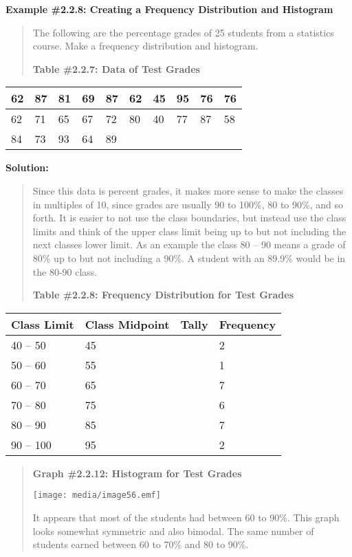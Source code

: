 \documentclass[]{book}
\begin{document}
\textbf{Example \#2.2.8: Creating a Frequency Distribution and Histogram}

\begin{quote}
The following are the percentage grades of 25 students from a
statistics course. Make a frequency distribution and histogram.

\textbf{Table \#2.2.7: Data of Test Grades}
\end{quote}

\begin{longtable}[]{@{}llllllllll@{}}
\toprule
62 & 87 & 81 & 69 & 87 & 62 & 45 & 95 & 76 & 76\tabularnewline
\midrule
\endhead
62 & 71 & 65 & 67 & 72 & 80 & 40 & 77 & 87 & 58\tabularnewline
84 & 73 & 93 & 64 & 89 & & & & &\tabularnewline
\bottomrule
\end{longtable}

\textbf{Solution:}

\begin{quote}
Since this data is percent grades, it makes more sense to make the
classes in multiples of 10, since grades are usually 90 to 100\%, 80 to
90\%, and so forth. It is easier to not use the class boundaries, but
instead use the class limits and think of the upper class limit being
up to but not including the next classes lower limit. As an example
the class 80 -- 90 means a grade of 80\% up to but not including a 90\%.
A student with an 89.9\% would be in the 80-90 class.

\textbf{Table \#2.2.8: Frequency Distribution for Test Grades}
\end{quote}

\begin{longtable}[]{@{}llll@{}}
\toprule
Class Limit & Class Midpoint & Tally & Frequency\tabularnewline
\midrule
\endhead
40 -- 50 & 45 & & 2\tabularnewline
50 -- 60 & 55 & & 1\tabularnewline
60 -- 70 & 65 & & 7\tabularnewline
70 -- 80 & 75 & & 6\tabularnewline
80 -- 90 & 85 & & 7\tabularnewline
90 -- 100 & 95 & & 2\tabularnewline
\bottomrule
\end{longtable}

\begin{quote}
\textbf{Graph \#2.2.12: Histogram for Test Grades}

\texttt{[image: media/image56.emf]}

It appears that most of the students had between 60 to 90\%. This graph
looks somewhat symmetric and also bimodal. The same number of students
earned between 60 to 70\% and 80 to 90\%.
\end{quote}
\end{document}
